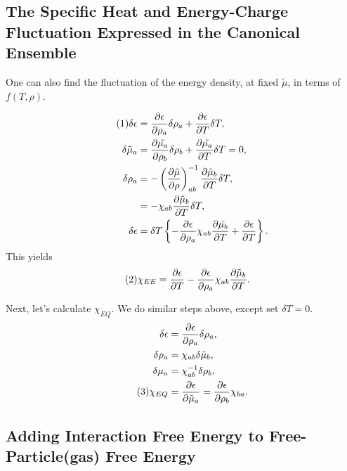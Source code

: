 \documentclass[12pt]{article}
\numberwithin{equation}{section}
\numberwithin{figure}{section}
\newcommand\eqnumber{\addtocounter{equation}{1}\tag{\theequation}}
\begin{document}
\subsection{The Specific Heat and Energy-Charge Fluctuation Expressed in the Canonical Ensemble}

One can also find the fluctuation of the energy density, at fixed $\tilde{\mu}$, in terms of $f(T,\rho)$.

\begin{align*}\eqnumber
\delta\epsilon&=
\frac{\partial\epsilon}{\partial\rho_a}\delta\rho_a
+\frac{\partial\epsilon}{\partial T}\delta T,\\
\delta\tilde{\mu}_a&=\frac{\partial\tilde{\mu_a}}{\partial\rho_b}\delta\rho_b+\frac{\partial\tilde{\mu_a}}{\partial T}\delta T=0,\\
\delta\rho_a&=-\left(\frac{\partial\tilde{\mu}}{\partial\rho}\right)_{ab}^{-1}\frac{\partial\tilde{\mu}_b}{\partial T}\delta T,\\
&=-\chi_{ab}\frac{\partial\tilde{\mu}_b}{\partial T}\delta T,\\
\delta\epsilon&=\delta T\left\{
-\frac{\partial \epsilon}{\partial\rho_a}\chi_{ab}\frac{\partial\tilde{\mu_b}}{\partial T}+\frac{\partial\epsilon}{\partial T}
\right\}.
\end{align*}
This yields
\begin{align*}\eqnumber\label{eq:chiEE}
\chi_{EE}&=\frac{\partial\epsilon}{\partial T}
-\frac{\partial\epsilon}{\partial\rho_a}\chi_{ab}\frac{\partial\tilde{\mu}_b}{\partial T}.
\end{align*}

Next, let's calculate $\chi_{EQ}$. We do similar steps above, except set $\delta T=0$.
\begin{align*}
\delta\epsilon&=\frac{\partial\epsilon}{\partial\rho_a}\delta\rho_a,\\
\delta\rho_a&=\chi_{ab}\delta\tilde{\mu}_b,\\
\delta\mu_a&=\chi^{-1}_{ab}\delta\rho_b,\\
\eqnumber\label{eq:chiEQ}
\chi_{EQ}&=\frac{\partial\epsilon}{\partial\tilde{\mu}_a}=\frac{\partial\epsilon}{\partial\rho_b}\chi_{ba}.
\end{align*}

\subsection{Adding Interaction Free Energy to Free-Particle(gas) Free Energy}
\end{document}
